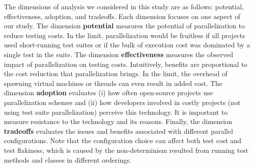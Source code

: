 

The dimensions of analysis we considered in this study are as follows:
potential, effectiveness, adoption, and tradeoffs.  Each dimension
focuses on one aspect of our study.  The dimension \textbf{potential}
measures the potential of parallelization to reduce testing costs.  In
the limit, parallelization would be fruitless if all projects used
short-running test suites or if the bulk of execution cost was
dominated by a single test in the suite.  The dimension
\textbf{effectiveness} measures the observed impact of
parallelization on testing costs.  Intuitively, benefits are
proportional to the cost reduction that parallelization brings.  In
the limit, the overhead of spawning virtual machines or threads can
even result in added cost.  The dimension \textbf{adoption} evaluates
(i) how often open-source projects use parallelization schemes and
(ii) how developers involved in costly projects (not using test suite
parallelization) perceive this technology.  It is important to measure
resistance to the technology and its reasons.  Finally, the dimension
\textbf{tradeoffs} evaluates the issues and benefits associated
with different parallel
configurations.  Note that the configuration choice can affect both
test cost and test flakiness, which is caused by the non-determinism
resulted from running test methods and classes in different
orderings.


